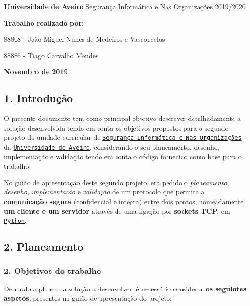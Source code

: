 {\bfseries Universidade de Aveiro} Segurança Informática e Nas Organizações 2019/2020

{\bfseries Trabalho realizado por\+:}


\begin{DoxyItemize}
\item 88808 -\/ João Miguel Nunes de Medeiros e Vasconcelos
\item 88886 -\/ Tiago Carvalho Mendes
\end{DoxyItemize}

{\bfseries Novembro de 2019}

\subsection*{1. Introdução}

O presente documento tem como principal objetivo descrever detalhadamente a solução desenvolvida tendo em conta os objetivos propostos para o segundo projeto da unidade curricular de \href{https://www.ua.pt/pt/uc/4143}{\tt Segurança Informática e Nas Organizações} da \href{www.ua.pt}{\tt Universidade de Aveiro}, considerando o seu planeamento, desenho, implementação e validação tendo em conta o código fornecido como base para o trabalho.

No guião de apresentação deste segundo projeto, era pedido o {\itshape planeamento}, {\itshape desenho}, {\itshape implementação} e {\itshape validação} de um protocolo que permita a {\bfseries comunicação segura} (confidencial e íntegra) entre dois pontos, nomeadamente {\bfseries um cliente e um servidor} através de uma ligação por {\bfseries sockets T\+CP}, em \href{https://realpython.com/python-sockets/}{\tt Python}.

\subsection*{2. Planeamento}

\subsubsection*{2. Objetivos do trabalho}

De modo a planear a solução a desenvolver, é necessário considerar {\bfseries os seguintes aspetos}, presentes no guião de apresentação do projeto\+:


